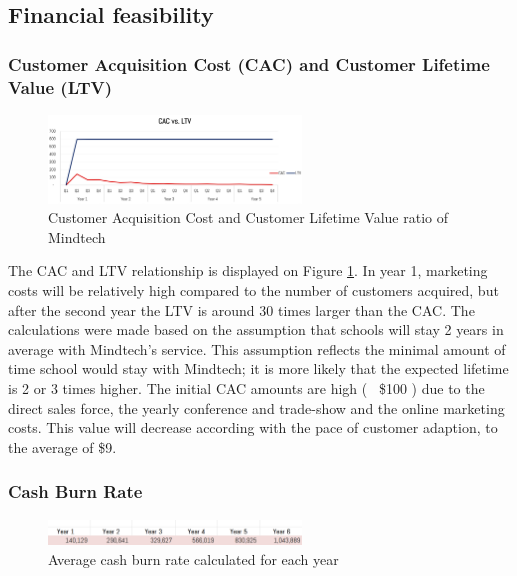 \documentclass[letterpaper,10pt]{article}
\let\oldsubsection\subsection
\renewcommand{\subsection}{\def\cursectioning{subsection}\oldsubsection}
\begin{document}
\subsection{Financial feasibility}

\subsubsection{Customer Acquisition Cost (CAC) and Customer Lifetime Value (LTV)}

\begin{figure}
\centering
\includegraphics[width=0.6\textwidth]{cacvsltc.PNG}
\caption{Customer Acquisition Cost and Customer Lifetime Value ratio of Mindtech}
\label{img:cac}
\end{figure}


The CAC and LTV relationship is displayed on Figure \ref{img:cac}. In year 1,  marketing costs will be relatively high compared to the number of customers acquired, but after the second year the LTV is around 30 times larger than the CAC. The calculations were made based on the assumption that schools will stay 2 years in average with Mindtech’s service. This assumption reflects the minimal amount of time school would stay with Mindtech; it is more likely that the expected lifetime is 2 or 3 times higher. The initial CAC amounts are high (~ \$100 ) due to the direct sales force, the yearly conference and trade-show and the online marketing costs. This value will decrease according with the pace of customer adaption, to the average of \$9. 


\subsubsection{Cash Burn Rate}

\begin{figure}
\centering
\includegraphics[width=0.6\textwidth]{cashburn.PNG}
\caption{Average cash burn rate calculated for each year}
\label{img:burn}
\end{figure}
\end{document}
